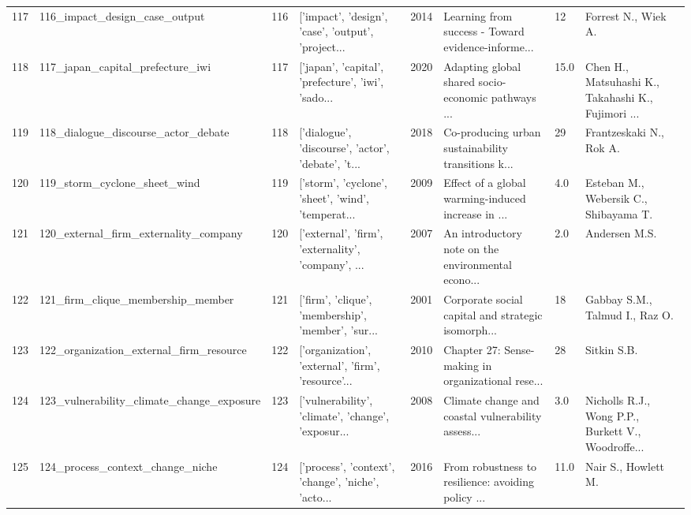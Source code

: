 \begin{tabular}{rlrlrlll}
        117 &                      116\_impact\_design\_case\_output &       116 & ['impact', 'design', 'case', 'output', 'project... &          2014 & Learning from success - Toward evidence-informe... &      12 &                                Forrest N., Wiek A. \\
        118 &                   117\_japan\_capital\_prefecture\_iwi &       117 & ['japan', 'capital', 'prefecture', 'iwi', 'sado... &          2020 & Adapting global shared socio-economic pathways ... &    15.0 & Chen H., Matsuhashi K., Takahashi K., Fujimori ... \\
        119 &                118\_dialogue\_discourse\_actor\_debate &       118 & ['dialogue', 'discourse', 'actor', 'debate', 't... &          2018 & Co-producing urban sustainability transitions k... &      29 &                            Frantzeskaki N., Rok A. \\
        120 &                       119\_storm\_cyclone\_sheet\_wind &       119 & ['storm', 'cyclone', 'sheet', 'wind', 'temperat... &          2009 & Effect of a global warming-induced increase in ... &     4.0 &              Esteban M., Webersik C., Shibayama T. \\
        121 &              120\_external\_firm\_externality\_company &       120 & ['external', 'firm', 'externality', 'company', ... &          2007 & An introductory note on the environmental econo... &     2.0 &                                      Andersen M.S. \\
        122 &                  121\_firm\_clique\_membership\_member &       121 & ['firm', 'clique', 'membership', 'member', 'sur... &          2001 & Corporate social capital and strategic isomorph... &      18 &                     Gabbay S.M., Talmud I., Raz O. \\
        123 &            122\_organization\_external\_firm\_resource &       122 & ['organization', 'external', 'firm', 'resource'... &          2010 & Chapter 27: Sense-making in organizational rese... &      28 &                                        Sitkin S.B. \\
        124 &          123\_vulnerability\_climate\_change\_exposure &       123 & ['vulnerability', 'climate', 'change', 'exposur... &          2008 & Climate change and coastal vulnerability assess... &     3.0 & Nicholls R.J., Wong P.P., Burkett V., Woodroffe... \\
        125 &                   124\_process\_context\_change\_niche &       124 & ['process', 'context', 'change', 'niche', 'acto... &          2016 & From robustness to resilience: avoiding policy ... &    11.0 &                                Nair S., Howlett M. \\

\end{tabular}

